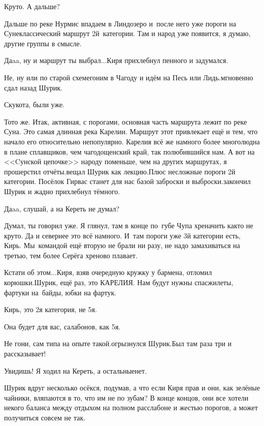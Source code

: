 \diagdash Круто. А дальше? 

\diagdash Дальше по реке Нурмис впадаем в Линдозеро и~после него уже пороги на Суне\mdash классический маршрут 2\sdash й~категории. Там и народ уже появится, я думаю, другие группы в смысле.

\diagdash Да\sdash a\sdash a, ну и маршрут ты выбрал$\ldots$\mdash Киря прихлебнул пенного и задумался.

\diagdash Не, ну или по старой схеме\mdash гоним в Чагоду и идём на Песь или Лидь.\mdash мгновенно сдал назад Шурик.

\diagdash Скукота, были уже.

\diagdash То\sdash то же. Итак, активная, с порогами, основная часть маршрута лежит по реке Суна. Это самая длинная река Карелии. Маршрут этот привлекает ещё и тем, что начало его относительно непопулярно. Карелия всё же намного более многолюдна в плане сплавщиков, чем чагодощенский край, так полюбившийся нам. А вот на <<Cунской цепочке>> народу поменьше, чем на других маршрутах, я прошерстил отчёты.\mdash вещал Шурик как лекцию.\mdash Плюс несложные пороги 2\sdash й категории. Посёлок Гирвас станет для нас базой заброски и выброски.\mdash закончил Шурик и жадно прихлебнул тёмного.

\diagdash Да\sdash a\sdash a, слушай, а на Кереть не думал?

\diagdash Думал, ты говорил уже. Я глянул, там в конце по~губе Чупа хреначить как\sdash то не круто. Да и севернее это всё намного. И~там пороги уже 3\sdash й категории есть, Кирь. Мы~командой ещё вторую не брали ни разу, не надо замахиваться на третью, тем более Серёга хреново плавает. 

\diagdash Кстати об этом$\ldots$\mdash Киря, взяв очередную кружку у бармена, отломил корюшки.\mdash Шурик, ещё раз, это КАРЕЛИЯ. Нам будут нужны спасжилеты, фартуки на~байды, юбки на фартук.

\diagdash Кирь, это 2\sdash я категория, не 5\sdash я.

\diagdash Она будет для вас, салабонов, как 5\sdash я.

\diagdash Не гони, сам типа на опыте такой.\mdash огрызнулся Шурик.\mdash Был там раза три и рассказывает!

\diagdash Увидишь! Я ходил на Кереть, а остальные\mdash нет.

Шурик вдруг несколько осёкся, подумав, а что если Киря прав и они, как зелёные чайники, вляпаются в то, что им не по зубам? В конце концов, они все хотели некого баланса между отдыхом на полном расслабоне и жестью порогов, а может получиться совсем не так.


